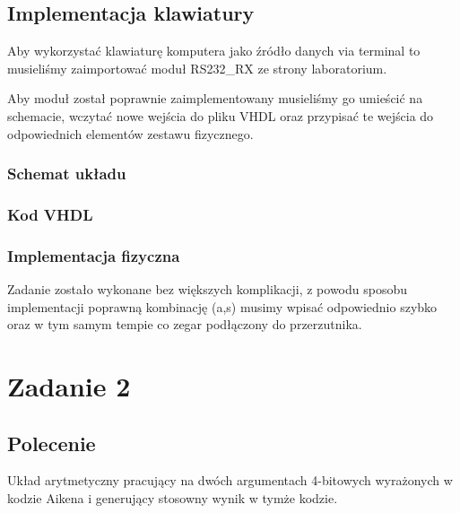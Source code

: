 \documentclass[a4paper,12pt]{extarticle}  %
\begin{document}
\subsection{Implementacja klawiatury}
Aby wykorzystać klawiaturę komputera jako źródło danych via terminal to musieliśmy zaimportować moduł RS232\_RX ze strony laboratorium.

Aby moduł został poprawnie zaimplementowany musieliśmy go umieścić na schemacie, wczytać nowe wejścia do pliku VHDL oraz przypisać te wejścia do odpowiednich elementów zestawu fizycznego.
\subsubsection{Schemat układu}
\begin{figure}[H]
	\centering
\end{figure}
\subsubsection{Kod VHDL}

\subsubsection{Implementacja fizyczna}


Zadanie zostało wykonane bez większych komplikacji, z powodu sposobu implementacji poprawną kombinację (a,s) musimy wpisać odpowiednio szybko oraz w tym samym tempie co zegar podłączony do przerzutnika.
\section{Zadanie 2}
\subsection{Polecenie}
Układ arytmetyczny pracujący na dwóch argumentach 4-bitowych wyrażonych w kodzie Aikena
i generujący stosowny wynik w tymże kodzie. 
\end{document}
